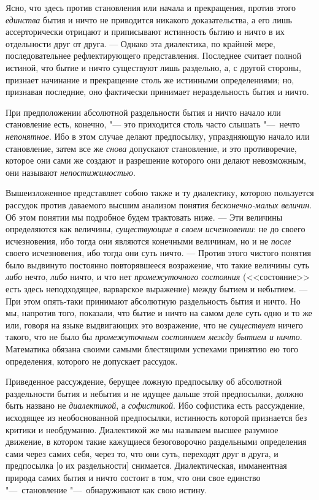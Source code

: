 Ясно, что здесь против становления или начала и прекращения, против этого
{\em единства} бытия и ничто не приводится никакого
доказательства, а его лишь ассерторически отрицают и приписывают истинность
бытию и ничто в их отдельности друг от друга. --- Однако эта диалектика, 
по крайней мере, последовательнее рефлектирующего представления. Последнее
считает полной истиной, что бытие и ничто существуют лишь раздельно, а, с
другой стороны, признает начинание и прекращение столь же истинными
определениями; но, признавая последние, оно фактически принимает
нераздельность бытия и ничто.

При предположении абсолютной раздельности бытия и ничто начало или
становление есть, конечно, "--- это приходится столь часто слышать "---~нечто
{\em непонятное}. Ибо в этом случае делают предпосылку,
упраздняющую начало или становление, затем все же
{\em снова} допускают становление, и это противоречие,
которое они сами же создают и разрешение которого они делают невозможным,
они называют {\em непостижимостью}.

Вышеизложенное представляет собою также и ту диалектику, которою пользуется
рассудок против даваемого высшим анализом понятия
{\em бесконечно-малых величин}. Об этом понятии мы
подробное будем трактовать ниже. --- Эти величины определяются как величины,
{\em существующие} {\em в своем
исчезновении}: не до своего исчезновения, ибо тогда они являются конечными
величинам, но и не {\em после} своего исчезновения, ибо
тогда они суть ничто. --- Против этого чистого понятия было выдвинуто
постоянно повторявшееся возражение, что такие величины суть
{\em либо} нечто, {\em либо} ничто,
и что нет {\em промежуточного состояния} (<<состояние>>
есть здесь неподходящее, варварское выражение) между бытием и небытием. ---
При этом опять-таки принимают абсолютную раздельность бытия и ничто. Но мы,
напротив того, показали, что бытие и ничто на самом деле суть одно и то же
или, говоря на языке выдвигающих это возражение, что не
{\em существует} ничего такого, что не было бы
{\em промежуточным состоянием между бытием и ничто}.
Математика обязана своими самыми блестящими успехами принятию ею того
определения, которого не допускает рассудок.

Приведенное рассуждение, берущее ложную предпосылку об абсолютной
раздельности бытия и небытия и не идущее дальше этой предпосылки, должно
быть названо не {\em диалектикой}, а
{\em софистикой}. Ибо софистика есть рассуждение,
исходящее из необоснованной предпосылки, истинность которой признается без
критики и необдуманно. Диалектикой же мы называем высшее разумное движение,
в котором такие кажущиеся безоговорочно раздельными определения сами через
самих себя, через то, что они суть, переходят друг в друга, и предпосылка
[о их раздельности] снимается. Диалектическая, имманентная природа самих
бытия и ничто состоит в том, что они свое единство "---~становление
"---~обнаруживают как свою истину.

